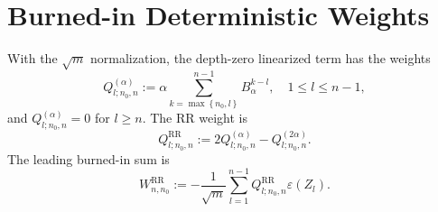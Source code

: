 
\section{Burned-in Deterministic Weights}

With the $\sqrt{m}$ normalization, the depth-zero linearized term has the
weights
\begin{equation}
Q_{l; n_{0}, n}^{(\alpha)}
  := \alpha \sum_{k = \max\left\{n_{0}, l\right\}}^{n - 1} B_{\alpha}^{k - l},
\quad
1 \le l \le n - 1,
\label{eq:burn-Q-alpha}
\end{equation}
and $Q_{l; n_{0}, n}^{(\alpha)} = 0$ for $l \ge n$. The RR weight is
\begin{equation}
Q_{l; n_{0}, n}^{\mathrm{RR}}
  := 2 Q_{l; n_{0}, n}^{(\alpha)}
     - Q_{l; n_{0}, n}^{(2 \alpha)}.
\label{eq:burn-Q-RR}
\end{equation}
The leading burned-in sum is
\begin{equation}
W_{n,n_{0}}^{\mathrm{RR}}
  := -\frac{1}{\sqrt{m}} \sum_{l = 1}^{n - 1}
      Q_{l; n_{0}, n}^{\mathrm{RR}} \varepsilon(Z_{l}).
\label{eq:burn-W-RR}
\end{equation}

